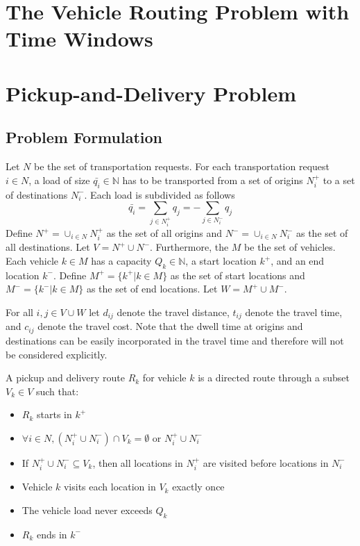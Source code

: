 		\chapter{The Vehicle Routing Problem with Time Windows}

		\chapter{Pickup-and-Delivery Problem}\label{chp:PDP}
			\section{Problem Formulation}
				Let $N$ be the set of transportation requests. For each transportation request $i \in N$, a load of size $\bar{q_i} \in \mathbb{N}$ has to be transported from a set of origins $N_i^+$ to a set of destinations $N_i^-$. Each load is subdivided as follows
				\begin{equation}
					\bar{q_i} = \sum_{j \in N_i^+} q_j = -\sum_{j \in N_i^-} q_j
				\end{equation}
				Define $N^+ = \cup_{i \in N} N_i^+$ as the set of all origins and $N^- = \cup_{i \in N}N_i^-$ as the set of all destinations. Let $V = N^+ \cup N^-$. Furthermore, the $M$ be the set of vehicles. Each vehicle $k \in M$ has a capacity $Q_k \in \mathbb{N}$, a start location $k^+$, and an end location $k^-$. Define $M^+ = \{k^+|k\in M\}$ as the set of start locations and $M^- = \{k^-|k\in M\}$ as the set of end locations. Let $W = M^+ \cup M^-$.

				For all $i, j \in V\cup W$ let $d_{ij}$ denote the travel distance, $t_{ij}$ denote the travel time, and $c_{ij}$ denote the travel cost. Note that the dwell time at origins and destinations can be easily incorporated in the travel time and therefore will not be considered explicitly.

				\begin{definition}
					A pickup and delivery route $R_k$ for vehicle $k$ is a directed route through a subset $V_k \in V$ such that:
					\begin{itemize}
						\item $R_k$ starts in $k^+$
						\item $\forall i \in N, (N_i^+ \cup N_i^-) \cap V_k = \emptyset \text{ or } N_i^+ \cup N_i^-$
						\item If $N_i^+ \cup N_i^- \subseteq V_k$, then all locations in $N_i^+$ are visited before locations in $N_i^-$
						\item Vehicle $k$ visits each location in $V_k$ exactly once
						\item The vehicle load never exceeds $Q_k$
						\item $R_k$ ends in $k^-$
					\end{itemize}
				\end{definition}

